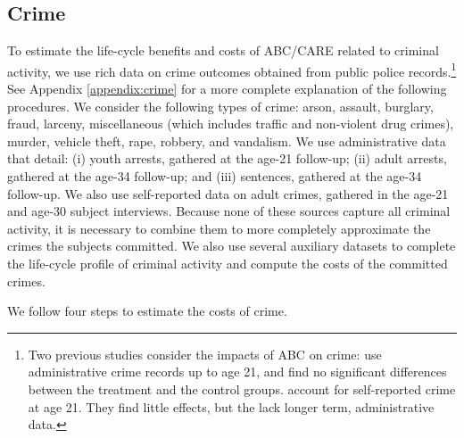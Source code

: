 \subsection{Crime}  \label{sec:crime}

To estimate the life-cycle benefits and costs of ABC/CARE related to criminal activity, we use rich data on crime outcomes obtained from public police records.\footnote{Two previous studies consider the impacts of ABC on crime: \citet{Clarke_Campbell_1998_ABC_Comparison_ECRQ} use administrative crime records up to age 21, and find no significant differences between the treatment and the control groups. \cite{Barnett_Masse_2002_benefitcost,Barnett_Masse_2007_EER} account for self-reported crime at age 21. They find little effects, but the lack longer term, administrative data.} See Appendix \ref{appendix:crime} for a more complete explanation of the following procedures. We consider the following types of crime: arson, assault, burglary, fraud, larceny, miscellaneous (which includes traffic and non-violent drug crimes), murder, vehicle theft, rape, robbery, and vandalism. We use administrative data that detail: (i) youth arrests, gathered at the age-21 follow-up; (ii) adult arrests, gathered at the age-34 follow-up; and (iii) sentences, gathered at the age-34 follow-up. We also use self-reported data on adult crimes, gathered in the age-21 and age-30 subject interviews. Because none of these sources capture all criminal activity, it is necessary to combine them to more completely approximate the crimes the subjects committed. We also use several auxiliary datasets to complete the life-cycle profile of criminal activity and compute the costs of the committed crimes.

We follow four steps to estimate the costs of crime.

